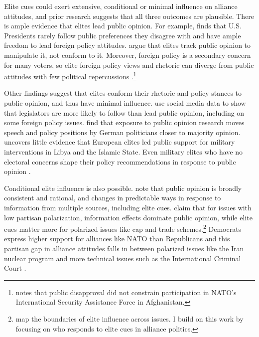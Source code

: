 \documentclass[12pt]{article}
\begin{document}
Elite cues could exert extensive, conditional or minimal influence on alliance attitudes, and prior research suggests that all three outcomes are plausible. 
There is ample evidence that elites lead public opinion. 
For example, \citet{Canes-Wrone2006} finds that U.S. Presidents rarely follow public preferences they disagree with and have ample freedom to lead foreign policy attitudes. 
\citet{JacobsShapiro2000} argue that elites track public opinion to manipulate it, not conform to it.
Moreover, foreign policy is a secondary concern for many voters, so elite foreign policy views and rhetoric can diverge from public attitudes with few political repercussions \citep{BusbyMonten2012}.\footnote{\citet{Kreps2010} notes that public disapproval did not constrain participation in NATO's International Security Assistance Force in Afghanistan.}


Other findings suggest that elites conform their rhetoric and policy stances to public opinion, and thus have minimal influence. 
\citet{Barberaetal2019} use social media data to show that legislators are more likely to follow than lead public opinion, including on some foreign policy issues. 
\citet{HagerHilbig2020} find that exposure to public opinion research moves speech and policy positions by German politicians closer to majority opinion. 
\citet{Haesebrouck2019} uncovers little evidence that European elites led public support for military interventions in Libya and the Islamic State. 
Even military elites who have no electoral concerns shape their policy recommendations in response to public opinion \citep{LinGreenberg2021}. 


Conditional elite influence is also possible. 
\citet{PageShapiro1992} note that public opinion is broadly consistent and rational, and changes in predictable ways in response to information from multiple sources, including elite cues. 
\citet{GuisingerSaunders2017} claim that for issues with low partisan polarization, information effects dominate public opinion, while elite cues matter more for polarized issues like cap and trade schemes.\footnote{\citet{GuisingerSaunders2017} map the boundaries of elite influence across issues. I build on this work by focusing on who responds to elite cues in alliance politics.}
Democrats express higher support for alliances like NATO than Republicans \citep{PewNATO2020} and this partisan gap in alliance attitudes falls in between polarized issues like the Iran nuclear program and more technical issues such as the International Criminal Court \citet{GuisingerSaunders2017}. 
\end{document}
